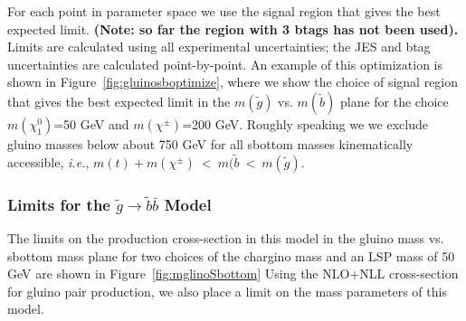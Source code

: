 For each point in parameter space we use the signal region that gives
the best expected limit.  
{\bf (Note: so far the region with 3 btags has not been used).}
Limits are calculated using all experimental
uncertainties; the JES and btag uncertainties are calculated point-by-point.
An example of this optimization is shown in Figure~\ref{fig:gluinosboptimize},
where we show the choice of signal region that gives the best expected limit
in the $m(\widetilde{g})$ vs. $m(\widetilde{b})$ plane for the choice
$m(\chi^0_1)$=50 GeV and $m(\chi^{\pm})$=200 GeV. 
Roughly speaking we we exclude gluino masses below about 750 GeV for 
all sbottom masses kinematically accessible, {\it i.e.}, 
$m(t)+m(\chi^{\pm})~<~m(\widetilde{b}~<~m(\widetilde{g})$.



\subsubsection{Limits for the $\widetilde{g} \to \widetilde{b}\bar{b}$ Model}
\label{sec:gbblimits}

The limits on the production cross-section in this model in the 
gluino mass vs. sbottom mass plane for two choices of the 
chargino mass and an LSP mass of 50 GeV 
are shown in Figure~\ref{fig:mglinoSbottom}
Using the 
NLO$+$NLL cross-section for gluino pair production, we also place a limit
on the mass parameters of this model.


